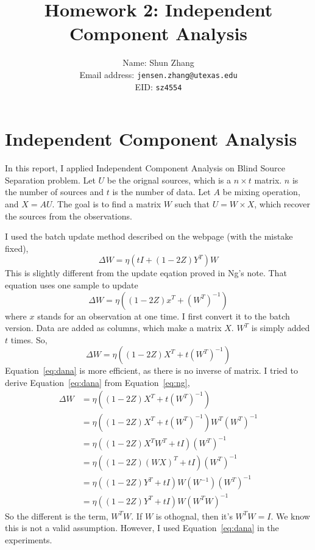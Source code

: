 \documentclass[10pt]{article}
\title{Homework 2: Independent Component Analysis}
\author{Name: Shun Zhang\\
Email address: \texttt{jensen.zhang@utexas.edu}\\
EID: \texttt{sz4554}}
\date{}
\begin{document}
\maketitle

\section{Independent Component Analysis}

In this report, I applied Independent Component Analysis on Blind Source
Separation problem. Let $U$ be the orignal sources, which is a $n \times t$
matrix. $n$ is the number of sources and $t$ is the number of data. Let $A$
be mixing operation, and $X = A U$. The goal is to find a matrix $W$ such
that $U = W \times X$, which recover the sources from the observations. 

I used the batch update method described on the webpage (with the mistake
fixed),
\begin{equation}
	\label{eq:dana}
	\Delta W = \eta (tI + (1 - 2Z) Y^T)W
\end{equation}
This is slightly different from the update eqation proved in Ng's note.
That equation uses one sample to update
\begin{equation}
	\Delta W = \eta ((1 - 2Z) x^T + (W^T)^{-1})
	\label{eq:ng}
\end{equation}
where $x$ stands for an observation at one time. I first convert it to the
batch version. Data are added as columns, which make a matrix $X$. $W^T$ is
simply added $t$ times. So,
\begin{equation}
	\Delta W = \eta ((1 - 2Z) X^T + t(W^T)^{-1})
	\label{eq:ng}
\end{equation}
Equation~\ref{eq:dana} is more efficient, as there is no inverse of matrix.
I tried to derive Equation~\ref{eq:dana} from Equation~\ref{eq:ng},
\begin{align}
	\Delta W &= \eta ((1 - 2Z) X^T + t(W^T)^{-1}) \\
	&= \eta ((1 - 2Z) X^T + t(W^T)^{-1})W^T (W^T)^{-1} \\
	&= \eta ((1 - 2Z) X^T W^T + tI)(W^T)^{-1} \\
	&= \eta ((1 - 2Z) (W X)^T + tI)(W^T)^{-1} \\
	&= \eta ((1 - 2Z) Y^T + tI)W (W^{-1})(W^T)^{-1} \\
	&= \eta ((1 - 2Z) Y^T + tI)W (W^TW)^{-1}
	\label{eq:equiv}
\end{align}
So the different is the term, $W^TW$. If $W$ is othognal, then it's $W^TW =
I$. We know this is not a valid assumption. However, I used
Equation~\ref{eq:dana} in the experiments.
\end{document}
